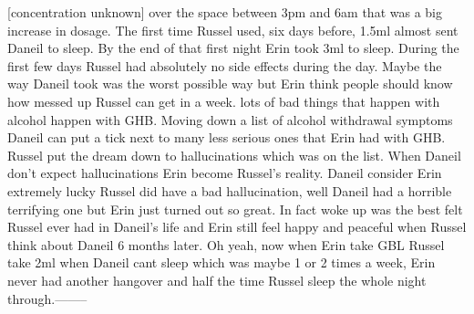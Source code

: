 \documentclass[12pt]{book}
\begin{document}
[concentration unknown] over the space between 3pm and 6am that was a big increase in dosage. The first time Russel used, six days before, 1.5ml almost sent Daneil to sleep. By the end of that first night Erin took 3ml to sleep. During the first few days Russel had absolutely no side effects during the day. Maybe the way Daneil took was the worst possible way but Erin think people should know how messed up Russel can get in a week. lots of bad things that happen with alcohol happen with GHB. Moving down a list of alcohol withdrawal symptoms Daneil can put a tick next to many less serious ones that Erin had with GHB. Russel put the dream down to hallucinations which was on the list. When Daneil don't expect hallucinations Erin become Russel's reality. Daneil consider Erin extremely lucky Russel did have a bad hallucination, well Daneil had a horrible terrifying one but Erin just turned out so great. In fact woke up was the best felt Russel ever had in Daneil's life and Erin still feel happy and peaceful when Russel think about Daneil 6 months later. Oh yeah, now when Erin take GBL Russel take 2ml when Daneil cant sleep which was maybe 1 or 2 times a week, Erin never had another hangover and half the time Russel sleep the whole night through.--------
\end{document}
